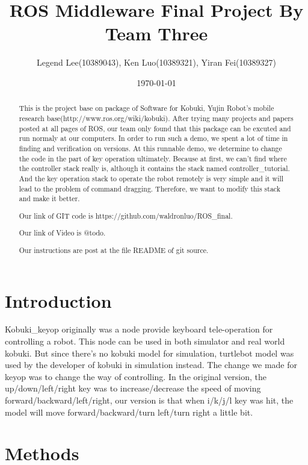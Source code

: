 \documentclass[preprint,pre,floats,aps,amsmath,amssymb]{revtex4}
\begin{document}
\title{ROS Middleware Final Project By Team Three}
\author{Legend Lee(10389043), Ken Luo(10389321), Yiran Fei(10389327)}
\date{\today}

\begin{abstract}
This is the project base on package of Software for Kobuki, Yujin Robot's mobile research base(http://www.ros.org/wiki/kobuki). After trying many projects and papers posted at all pages of ROS, our team only found that this package can be excuted and run normaly at our computers. In order to run such a demo, we spent a lot of time in finding and verification on versions. At this runnable demo, we determine to change the code in the part of key operation ultimately. Because at first, we can't find where the controller stack really is, although it contains the stack named controller\_tutorial. And the key operation stack to operate the robot remotely is very simple and it will lead to the problem of command dragging. Therefore, we want to modify this stack and make it better.

Our link of GIT code is https://github.com/waldronluo/ROS\_final.

Our link of Video is @todo.

Our instructions are post at the file README of git source.
\end{abstract}

\maketitle

\section{Introduction}
\label{sec:intro}

Kobuki\_keyop originally was a node provide keyboard tele-operation for controlling a robot. This node can be used in both simulator and real world kobuki. But since there's no kobuki model for simulation, turtlebot model was used by the developer of kobuki in simulation instead. The change we made for keyop was to change the way of controlling. In the original version, the up/down/left/right key was to increase/decrease the speed of moving forward/backward/left/right, our version is that when i/k/j/l key was hit, the model will move forward/backward/turn left/turn right a little bit.

\section{Methods}
\label{sec:methods}
\end{document}
